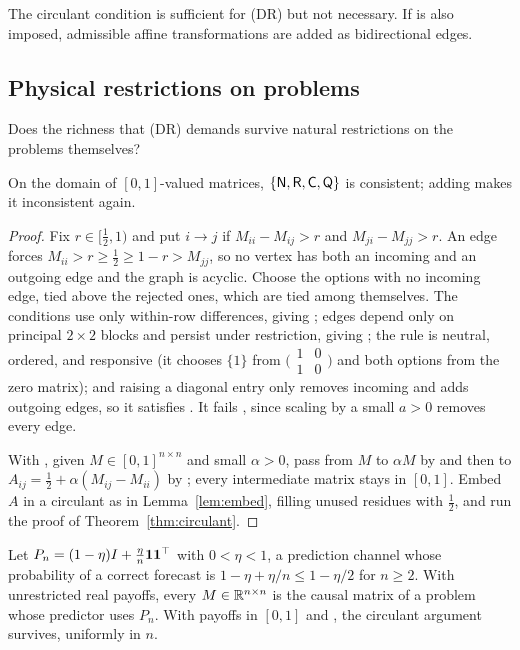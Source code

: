 The circulant condition is sufficient for (DR) but not necessary. If  is also imposed, admissible
affine transformations are added as bidirectional edges.

\subsection{Physical restrictions on problems}

Does the richness that (DR) demands survive natural restrictions on the problems themselves?

\begin{proposition}\label{prop:bounded}
On the domain of $[0,1]$-valued matrices, $\{\textup{\textsf{N}},\textup{\textsf{R}},\textup{\textsf{C}},\textup{\textsf{Q}}\}$ is consistent; adding 
makes it inconsistent again.
\end{proposition}

\begin{proof}
Fix $r\in[\tfrac12,1)$ and put $i\to j$ if $M_{ii}-M_{ij}>r$ and $M_{ji}-M_{jj}>r$. An edge forces
$M_{ii}>r\ge\tfrac12\ge1-r>M_{jj}$, so no vertex has both an incoming and an outgoing edge and the graph
is acyclic. Choose the options with no incoming edge, tied above the rejected ones, which are tied
among themselves. The conditions use only within-row differences, giving ; edges depend only on
principal $2\times2$ blocks and persist under restriction, giving ; the rule is neutral, ordered,
and responsive (it chooses $\{1\}$ from $\bigl(\begin{smallmatrix}1&0\\1&0\end{smallmatrix}\bigr)$ and
both options from the zero matrix); and raising a diagonal entry only removes incoming and adds
outgoing edges, so it satisfies \Mon. It fails , since scaling by a small $a>0$ removes every
edge.

With , given $M\in[0,1]^{n\times n}$ and small $\alpha>0$, pass from $M$ to $\alpha M$ by  and
then to $A_{ij}=\tfrac12+\alpha(M_{ij}-M_{ii})$ by ; every intermediate matrix stays in $[0,1]$.
Embed $A$ in a circulant as in Lemma~\ref{lem:embed}, filling unused residues with $\tfrac12$, and run
the proof of Theorem~\ref{thm:circulant}.
\end{proof}

\begin{proposition}\label{prop:noisy}
Let $P_n=(1-\eta)I+\tfrac{\eta}{n}\mathbf{1}\mathbf{1}^\top$ with $0<\eta<1$, a prediction channel whose
probability of a correct forecast is $1-\eta+\eta/n\le1-\eta/2$ for $n\ge2$. With unrestricted real
payoffs, every $M\in\mathbb{R}^{n\times n}$ is the causal matrix of a problem whose predictor uses $P_n$. With
payoffs in $[0,1]$ and , the circulant argument survives, uniformly in $n$.
\end{proposition}

